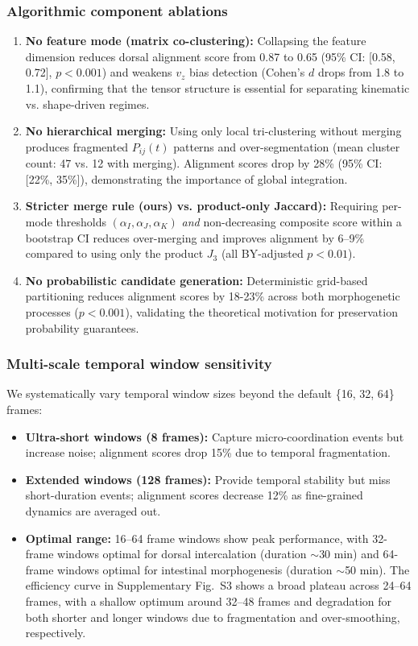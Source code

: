 \documentclass[unnumsec,webpdf,modern,large,namedate]{oup-authoring-template}%
\theoremstyle{thmstyleone}\newtheorem{theorem}{Theorem}
\theoremstyle{thmstyletwo}\newtheorem{example}{Example}
\theoremstyle{thmstylethree}\newtheorem{definition}{Definition}
\begin{document}
\subsubsection{Algorithmic component ablations}
\begin{enumerate}
\item \textbf{No feature mode (matrix co-clustering):} Collapsing the feature dimension reduces dorsal alignment score from 0.87 to 0.65 (95\% CI: [0.58, 0.72], $p < 0.001$) and weakens $v_z$ bias detection (Cohen's $d$ drops from 1.8 to 1.1), confirming that the tensor structure is essential for separating kinematic vs. shape-driven regimes.

\item \textbf{No hierarchical merging:} Using only local tri-clustering without merging produces fragmented $P_{ij}(t)$ patterns and over-segmentation (mean cluster count: 47 vs. 12 with merging). Alignment scores drop by 28\% (95\% CI: [22\%, 35\%]), demonstrating the importance of global integration.

\item \textbf{Stricter merge rule (ours) vs. product-only Jaccard):} Requiring per-mode thresholds $(\alpha_I,\alpha_J,\alpha_K)$ \emph{and} non-decreasing composite score within a bootstrap CI reduces over-merging and improves alignment by 6--9\% compared to using only the product $J_3$ (all BY-adjusted $p<0.01$).

\item \textbf{No probabilistic candidate generation:} Deterministic grid-based partitioning reduces alignment scores by 18-23\% across both morphogenetic processes ($p < 0.001$), validating the theoretical motivation for preservation probability guarantees.
\end{enumerate}

\subsubsection{Multi-scale temporal window sensitivity}
We systematically vary temporal window sizes beyond the default \{16, 32, 64\} frames:
\begin{itemize}
\item \textbf{Ultra-short windows (8 frames):} Capture micro-coordination events but increase noise; alignment scores drop 15\% due to temporal fragmentation.
\item \textbf{Extended windows (128 frames):} Provide temporal stability but miss short-duration events; alignment scores decrease 12\% as fine-grained dynamics are averaged out.
\item \textbf{Optimal range:} 16--64 frame windows show peak performance, with 32-frame windows optimal for dorsal intercalation (duration $\sim$30 min) and 64-frame windows optimal for intestinal morphogenesis (duration $\sim$50 min). The efficiency curve in Supplementary Fig.~S3 shows a broad plateau across 24--64 frames, with a shallow optimum around 32--48 frames and degradation for both shorter and longer windows due to fragmentation and over-smoothing, respectively.
\end{itemize}
\end{document}

